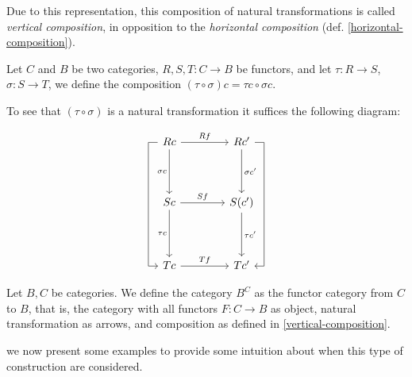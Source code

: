 Due to this representation, this composition of natural transformations is called \emph{vertical composition}, in opposition to the \emph{horizontal composition} (def. \ref{horizontal-composition}).

\begin{definition}\label{vertical-composition}
Let $C$ and $B$ be two categories, $R,S,T : C \to B$ be functors, and let $\tau: R \to S$, $\sigma:S\to T$, we define the composition $(\tau \circ \sigma)c = \tau c\circ \sigma c$.
\end{definition}

To see that $(\tau \circ \sigma)$ is a natural transformation it suffices the following diagram\cite{stack-composition-natural}:

$$
\begin{tikzcd}[row sep = 1.4cm, column sep = 1.4cm]
  R c
  \arrow[lddr, to path= { --
    ([xshift=-1ex]\tikztostart.west)
    -| ([xshift=-2ex]\tikztotarget.west)
    |- (\tikztotarget)}]
  \arrow[d, swap, "\sigma c"]
  \arrow[r, "R f"] 
  & R c'
  \arrow[d, "\sigma c'"]
  \arrow[rddl, to path= { --
    ([xshift=1ex]\tikztostart.east) 
    -| ([xshift=2ex]\tikztotarget.east)
    -- (\tikztotarget)}, "\sigma \circ \tau c'"]
  \\
  S c
  \arrow[d, swap, "\tau c "] 
  \arrow[r, "S f "] & S(c')
  \arrow[d, "\tau c'"] \\
  T c 
  \arrow[r, "T f"] & T c'
\end{tikzcd}
$$



\begin{definition}
  Let $B,C$ be categories. We define the category $B^C$ as the functor category from $C$ to $B$, that is, the category with all functors $F:C \to B$ as object, natural transformation as arrows, and composition as defined in \ref{vertical-composition}.
\end{definition}

we now present some examples to provide some intuition about when this type of construction are considered.


